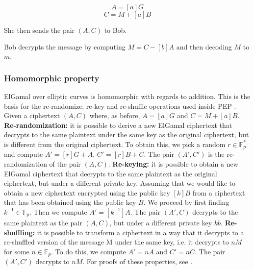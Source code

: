 \documentclass{report}
\begin{document}
$$A=[a]G$$
$$C=M+[a]B$$

She then sends the pair $(A, C)$ to Bob. \par
Bob decrypts the message by computing $M=C-[b]A$ and then decoding $M$ to $m$.

\subsubsection{Homomorphic property}
ElGamal over elliptic curves is homomorphic with regards to addition. This is the basis for the re-randomize, re-key and re-shuffle operations used inside PEP \cite{peppaper}.
\newline \newline
Given a ciphertext $(A, C)$ where, as before, $A=[a]G$ and $C=M+[a]B$.
\textbf{Re-randomization:} it is possible to derive a new ElGamal ciphertext that decrypts to the same plaintext under the same key as the original ciphertext, but is different
from the original ciphertext. To obtain this, we pick a random $r \in \mathds{F}^*_p$ and compute $A'=[r]G+A$, $C'=[r]B+C$. The pair $(A', C')$ is the re-randomization of the pair $(A, C)$. \newline
\textbf{Re-keying:} it is possible to obtain a new ElGamal ciphertext that decrypts to the same plaintext as the original ciphertext, but under a different private key. Assuming
that we would like to obtain a new ciphertext encrypted using the public key $[k]B$ from a ciphertext that has been obtained using the public key $B$. We proceed by first
finding $k^{-1} \in \mathds{F}_p$. Then we compute $A'=[k^{-1}]A$. The pair $(A', C)$ decrypts to the same plaintext as the pair $(A, C)$, but under a different private key $kb$.
\newline
\textbf{Re-shuffling:} it is possible to transform a ciphertext in a way that it decrypts to a re-shuffled version of the message M under the same key, i.e. it decrypts to $nM$ for
some $n \in \mathds{F}_p$. To do this, we compute $A'=nA$ and $C'=nC$. The pair $(A', C')$ decrypts to $nM$. \newline
For proofs of these properties, see \cite{pep-whitepaper}. 
\end{document}
